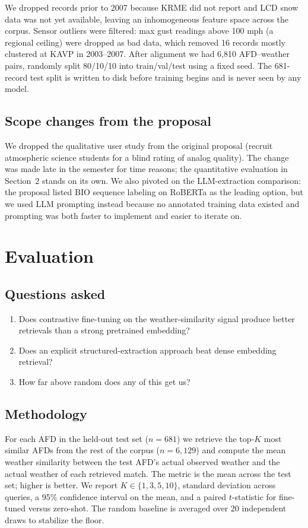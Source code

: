 \documentclass[11pt]{article}
\begin{document}
We dropped records prior to 2007 because KRME did not report and LCD snow data was not yet available, leaving an inhomogeneous feature space across the corpus. Sensor outliers were filtered: max gust readings above 100 mph (a regional ceiling) were dropped as bad data, which removed 16 records mostly clustered at KAVP in 2003--2007. After alignment we had 6{,}810 AFD--weather pairs, randomly split 80/10/10 into train/val/test using a fixed seed. The 681-record test split is written to disk before training begins and is never seen by any model.

\subsection{Scope changes from the proposal}
We dropped the qualitative user study from the original proposal (recruit atmospheric science students for a blind rating of analog quality). The change was made late in the semester for time reasons; the quantitative evaluation in Section~2 stands on its own. We also pivoted on the LLM-extraction comparison: the proposal listed BIO sequence labeling on RoBERTa as the leading option, but we used LLM prompting instead because no annotated training data existed and prompting was both faster to implement and easier to iterate on.

\section{Evaluation}

\subsection{Questions asked}
\begin{enumerate}
  \item Does contrastive fine-tuning on the weather-similarity signal produce better retrievals than a strong pretrained embedding?
  \item Does an explicit structured-extraction approach beat dense embedding retrieval?
  \item How far above random does any of this get us?
\end{enumerate}

\subsection{Methodology}
For each AFD in the held-out test set (\(n=681\)) we retrieve the top-\(K\) most similar AFDs from the rest of the corpus (\(n=6{,}129\)) and compute the mean weather similarity between the test AFD's actual observed weather and the actual weather of each retrieved match. The metric is the mean across the test set; higher is better. We report \(K \in \{1, 3, 5, 10\}\), standard deviation across queries, a 95\% confidence interval on the mean, and a paired \(t\)-statistic for fine-tuned versus zero-shot. The random baseline is averaged over 20 independent draws to stabilize the floor.
\end{document}
